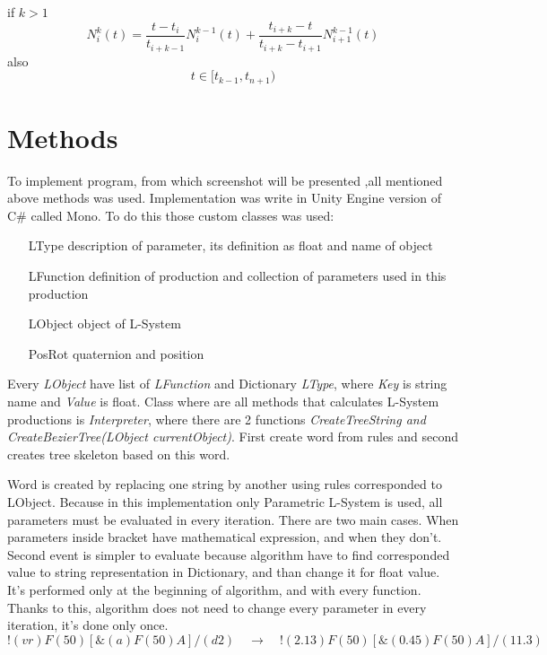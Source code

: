 \documentclass[b5paper,twoside,11pt]{article}
\begin{document}
  if $k > 1$
   \begin{equation}
  N_{i}^{k}(t)=\frac{t-t_i}{t_{i+k-1}} N_{i}^{k-1}(t) + \frac{t_{i+k} - t}{t_{i+k} - t_{i+1}} N_{i+1}^{k-1}(t)
 \end{equation}
 also
    \begin{equation}
    t\in[t_{k-1},t_{n+1})	
 \end{equation}

\section{Methods}
To implement program, from which screenshot will be presented ,all mentioned above methods was used. Implementation was write in Unity Engine version of C\# called Mono. To do this those custom classes was used:
\begin{itemize}[labelindent=5.5em,labelsep=1cm,leftmargin=*]
\item [LType] description of parameter, its definition as float and name of object
\item [LFunction] definition of production and collection of parameters used in this production
\item [LObject] object of L-System
\item [PosRot] quaternion and position
\end{itemize}
Every \textit{LObject} have list of \textit{LFunction} and Dictionary \textit{LType}, where \textit{Key} is string name and \textit{Value} is float.
Class where are all methods that calculates L-System productions is \textit{Interpreter}, where there are 2  functions \textit{CreateTreeString and} \textit{CreateBezierTree(LObject currentObject)}. First create word from rules and second creates tree skeleton based on this word. \par
Word is created by replacing one string by another using rules corresponded to LObject. Because in this implementation only Parametric L-System is used, all parameters must be evaluated in every iteration. There are two main cases. When parameters inside bracket have mathematical expression, and when they don't. Second event is simpler to evaluate because algorithm have to find corresponded value to string representation in Dictionary, and than change it for float value. It's performed only at the beginning of algorithm, and with every function. Thanks to this, algorithm does not need to change every parameter in every iteration, it's done only once.
\begin{equation} 
!(vr)F(50)[ \&(a)F(50)A]/(d2) \quad\longrightarrow\quad !(2.13)F(50)[ \&(0.45)F(50)A]/(11.3)
 \end{equation}
\end{document}
